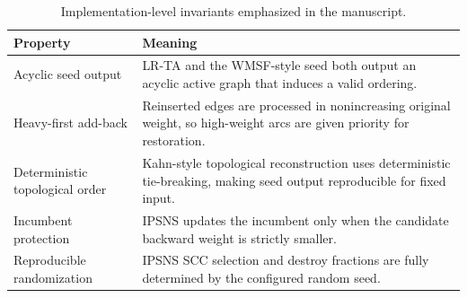 \begin{table}[t]
\centering
\caption{Implementation-level invariants emphasized in the manuscript.}
\label{tab:algorithm-invariants}
\begin{tabular}{>{\raggedright\arraybackslash}p{2.8cm} >{\raggedright\arraybackslash}p{9.2cm}}
\toprule
Property & Meaning \\
\midrule
Acyclic seed output & LR-TA and the WMSF-style seed both output an acyclic active graph that induces a valid ordering. \\
Heavy-first add-back & Reinserted edges are processed in nonincreasing original weight, so high-weight arcs are given priority for restoration. \\
Deterministic topological order & Kahn-style topological reconstruction uses deterministic tie-breaking, making seed output reproducible for fixed input. \\
Incumbent protection & IPSNS updates the incumbent only when the candidate backward weight is strictly smaller. \\
Reproducible randomization & IPSNS SCC selection and destroy fractions are fully determined by the configured random seed. \\
\bottomrule
\end{tabular}
\end{table}
